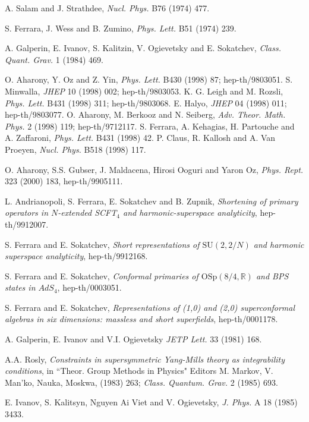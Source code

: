 \documentclass[a4paper,12pt]{article}
\begin{document}
\begin{thebibliography}{99}
 A. Salam and J. Strathdee, {\it Nucl. Phys.} B76 (1974) 477. 


S. Ferrara, J. Wess and B. Zumino, {\it Phys. Lett.} B51 (1974) 
239.
 
 A. Galperin, E. Ivanov, S. Kalitzin, V. Ogievetsky and
E. Sokatchev, {\it Class. Quant. Grav.} 1 (1984) 469.  

 O. Aharony, Y. Oz and Z. Yin, {\it  Phys. Lett.} 
B430 (1998) 87; hep-th/9803051. 
 S. Minwalla, {\it JHEP} 10 (1998) 002; hep-th/9803053. 
 K. G. Leigh and M. Rozsli, {\it  Phys. Lett.} 
B431 (1998) 311; hep-th/9803068. 
 E. Halyo, {\it JHEP} 04 (1998) 011; hep-th/9803077.
 O. Aharony, M. Berkooz and N. Seiberg, 
{\it  Adv. Theor. Math. Phys.} 2 (1998) 119; hep-th/9712117. 
  S. Ferrara, A. Kehagias, H. Partouche and A. Zaffaroni, 
{\it  Phys. Lett.} B431 (1998) 42. 
P. Claus, R. Kallosh and A. Van Proeyen, {\it Nucl. Phys.} B518 
(1998) 117. 

 O. Aharony, S.S. Gubser, J. 
Maldacena, Hirosi Ooguri and Yaron Oz, {\it Phys. Rept.} 323 
(2000) 183,  hep-th/9905111.

 L. Andrianopoli, S. Ferrara, E. Sokatchev and B. Zupnik, 
{\it Shortening of primary operators in $N$-extended SCFT$_4$ and 
harmonic-superspace analyticity}, hep-th/9912007. 

 S. Ferrara and E. Sokatchev, 
{\it Short representations of $\mbox{SU}(2,2/N)$ and harmonic 
superspace analyticity}, hep-th/9912168. 

 S. Ferrara and E. Sokatchev, 
{\it Conformal primaries of $\mbox{OSp}(8/4,\mathbb{R})$ and BPS 
states in $AdS_4$}, hep-th/0003051. 

 S. Ferrara and E. Sokatchev, 
{\it Representations of (1,0) and (2,0) superconformal algebras in 
six dimensions: massless and short superfields}, hep-th/0001178.   

 A. Galperin, E. Ivanov and V.I. Ogievetsky {\it JETP Lett.} 
33 (1981) 168. 

 A.A. Rosly, {\it Constraints in supersymmetric Yang-Mills theory as 
integrability conditions}, in ``Theor. Group Methods in Physics" 
Editors M. Markov, V. Man'ko, Nauka, Moskwa, (1983) 263; {\it 
Class. Quantum.  Grav.} 2 (1985) 693. 


 E. Ivanov, 
S. Kalitsyn, Nguyen Ai Viet and V. Ogievetsky, {\it J. Phys.}  A 
18 (1985) 3433. 



\end{thebibliography}
\end{document}
